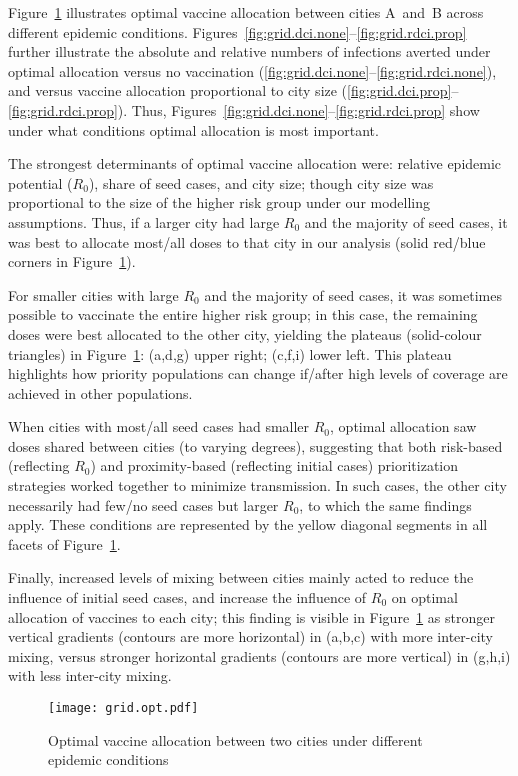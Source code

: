 Figure~\ref{fig:grid.opt} illustrates optimal vaccine allocation between cities A~and~B
across different epidemic conditions.
Figures~\ref{fig:grid.dci.none}--\ref{fig:grid.rdci.prop} further illustrate the
absolute and relative numbers of infections averted under optimal allocation
versus no vaccination (\ref{fig:grid.dci.none}--\ref{fig:grid.rdci.none}), and
versus vaccine allocation proportional to city size (\ref{fig:grid.dci.prop}--\ref{fig:grid.rdci.prop}).
Thus, Figures~\ref{fig:grid.dci.none}--\ref{fig:grid.rdci.prop}
show under what conditions optimal allocation is most important.
\par
The strongest determinants of optimal vaccine allocation were:
relative epidemic potential ($R_0$), share of seed cases, and city size;
though city size was proportional to
the size of the higher risk group under our modelling assumptions.
Thus, if a larger city had large $R_0$ and the majority of seed cases,
it was best to allocate most/all doses to that city in our analysis
(solid red/blue corners in Figure~\ref{fig:grid.opt}).
\par
For smaller cities with large $R_0$ and the majority of seed cases,
it was sometimes possible to vaccinate the entire higher risk group;
in this case, the remaining doses were best allocated to the other city,
yielding the plateaus (solid-colour triangles) in Figure~\ref{fig:grid.opt}:
(a,d,g) upper right; (c,f,i) lower left.
This plateau highlights how priority populations can change
if/after high levels of coverage are achieved in other populations.
\par
When cities with most/all seed cases had smaller $R_0$,
optimal allocation saw doses shared between cities (to varying degrees),
suggesting that both risk-based (reflecting $R_0$) and
proximity-based (reflecting initial cases) prioritization strategies
worked together to minimize transmission.
In such cases, the other city necessarily had few/no seed cases but larger $R_0$,
to which the same findings apply.
These conditions are represented by the yellow diagonal segments
in all facets of Figure~\ref{fig:grid.opt}.
\par
Finally, increased levels of mixing between cities
mainly acted to reduce the influence of initial seed cases,
and increase the influence of $R_0$
on optimal allocation of vaccines to each city;
this finding is visible in Figure~\ref{fig:grid.opt} as
stronger vertical gradients (contours are more horizontal) in (a,b,c) with more inter-city mixing, versus
stronger horizontal gradients (contours are more vertical) in (g,h,i) with less inter-city mixing.
\begin{figure}
  \texttt{[image: grid.opt.pdf]}
  \caption{Optimal vaccine allocation between two cities under different epidemic conditions}
  \label{fig:grid.opt}
  \floatfoot
  \gridfoot
\end{figure}
